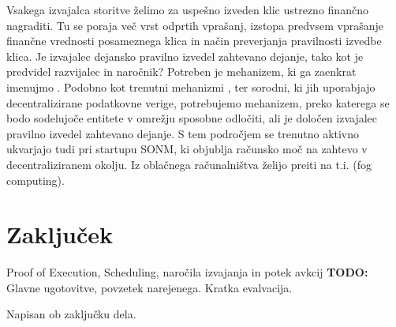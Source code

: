 \documentclass[a4paper, 12pt]{book}
\begin{document}
Vsakega izvajalca storitve želimo za uspešno izveden klic ustrezno finančno nagraditi. Tu se poraja več vrst odprtih vprašanj, izstopa predvsem vprašanje finančne vrednosti posameznega klica in način preverjanja pravilnosti izvedbe klica.
Je izvajalec dejansko pravilno izvedel zahtevano dejanje, tako kot je predvidel razvijalec in naročnik?
Potreben je mehanizem, ki ga zaenkrat imenujmo .
Podobno kot trenutni mehanizmi ,  ter sorodni, ki jih uporabjajo decentralizirane podatkovne verige, potrebujemo mehanizem, preko katerega se bodo sodelujoče entitete v omrežju sposobne odločiti, ali je določen izvajalec pravilno izvedel zahtevano dejanje.
S tem področjem se trenutno aktivno ukvarjajo tudi pri startupu SONM, ki objublja računsko moč na zahtevo v decentraliziranem okolju. Iz oblačnega računalništva želijo preiti na t.i.  (fog computing). \cite{Sonm}

\chapter{Zaključek}
\label{stroka}

Proof of Execution, Scheduling, naročila izvajanja in potek avkcij
\textbf{TODO:} Glavne ugotovitve, povzetek narejenega. Kratka evalvacija.

Napisan ob zaključku dela.


\newpage %
\ \\
\clearpage
{}


\end{document}
